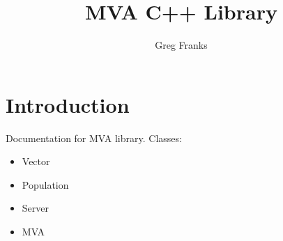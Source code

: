 \documentclass{book}
\title{MVA C++ Library}
\author{Greg Franks}
\begin{document}

\maketitle
\clearpage
\tableofcontents
\clearpage
\section{Introduction}
\label{sec:introduction}
\label{topnode}
Documentation for MVA library.
Classes:
\begin{iftex}
\begin{itemize}
\item Vector
\item Population
\item Server
\item MVA
\end{itemize}
\end{iftex}






\end{document}
